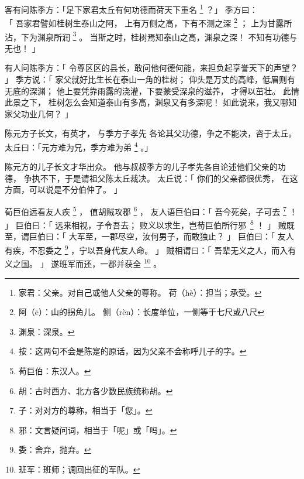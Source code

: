 \begin{paracol}{2}
\switchcolumn*[\section{}]

客有问陈季方：「足下家君太丘有何功德而荷天下重名%
\footnote{%
    家君：父亲。对自己或他人父亲的尊称。
    荷（hè）：担当；承受。
}%
？」
季方曰：\\「
    吾家君譬如桂树生泰山之阿，
    上有万侧之高，下有不测之深%
    \footnote{%
        阿（ē）：山的拐角儿。
        侧（rèn）：长度单位，一侧等于七尺或八尺
    }%
    ；
    上为甘露所沾，下为渊泉所润%
    \footnote{%
        渊泉：深泉。
    }%
    。
    当斯之时，桂树焉知泰山之高，渊泉之深！
    不知有功德与无也！
」

\switchcolumn

有人问陈季方：「
    令尊区区的县长，敢问他何德何能，来担负起享誉天下的声望？
」
季方说：「
    家父就好比生长在泰山一角的桂树；
    仰头是万丈的高峰，低眉则有无底的深渊；
    他上要凭靠雨露的浇灌，下要蒙受深泉的滋养，
    才得以茁壮。
    此情此景之下，
    桂树怎么会知道泰山有多高，渊泉又有多深呢！
    如此说来，我又哪知家父功业几何？
」


\switchcolumn*[\section{}]

陈元方子长文，有英才，
与季方子孝先
各论其父功德，争之不能决，咨于太丘。
太丘曰：「元方难为兄，季方难为弟%
\footnote{%
    按：这两句不会是陈寔的原话，因为父亲不会称呼儿子的字。
}%
。」

\switchcolumn

陈元方的儿子长文才华出众。
他与叔叔季方的儿子孝先各自论述他们父亲的功德，
争执不下，于是请祖父陈太丘裁决。
太丘说：「
    你们的父亲都很优秀，
    在这方面，可以说是不分伯仲了。
」


\switchcolumn*[\section{}]

荀巨伯远看友人疾%
\footnote{%
    荀巨伯：东汉人。
}%
，
值胡贼攻郡%
\footnote{%
    胡：古时西方、北方各少数民族统称胡。
}%
，
友人语巨伯曰：「
    吾今死矣，子可去%
    \footnote{%
        子：对对方的尊称，相当于「您」。
    }%
    ！
」
巨伯曰：「
    远来相视，子令吾去；
    败义以求生，岂荀巨伯所行\mbox{邪%
    \footnote{%
        邪：文言疑问词，相当于「呢」或「吗」。
    }}%
    ！
」
贼既至，谓巨伯曰：「
    大军至，一郡尽空，汝何男子，而敢独止？
」
巨伯曰：「
    友人有疾，不忍委之%
    \footnote{%
        委：舍弃，抛弃。
    }%
    ，宁以吾身代友人命。
」
贼相谓曰：「
    吾辈无义之人，而入有义之国。
」
遂班军而还，一郡并获全%
\footnote{%
    班军：班师；调回出征的军队。
}%
。


\end{paracol}
